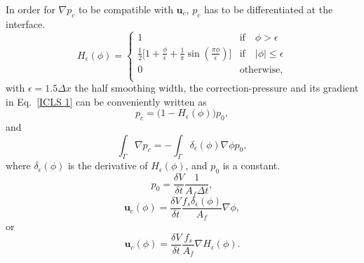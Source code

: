 In order for $\nabla p_c$ to be compatible with ${\bm u}_c$, $p_c$ has to be differentiated at the interface. 
\begin{equation}
    H_\epsilon(\phi)=
    \begin{cases}
        1 \quad \quad & \textrm{if} \quad \phi > \epsilon \\
        \tfrac{1}{2}\big[1+\tfrac{\phi}{\epsilon}+\tfrac{1}{\pi} \sin(\tfrac{\pi \phi}{\epsilon})\big] & 
        \textrm{if} \quad |\phi| \leqslant \epsilon  \\
        0 \quad & \textrm{otherwise}, \\
    \end{cases}
    \label{regularized heav}
\end{equation}
with $\epsilon=1.5\Delta x$ the half smoothing width, the correction-pressure and its gradient in Eq.\ \eqref{ICLS 1} can be conveniently written as
\begin{equation}
    p_c = \big(1-H_\epsilon(\phi)\big)p_0,
  \label{ipressure}
\end{equation}
and
\begin{equation}
    \int_\Gamma \nabla p_c = - \int_\Gamma \delta_\epsilon (\phi) \nabla \phi p_0,
  \label{ipressure grad}
\end{equation}
where $\delta_\epsilon (\phi)$ is the derivative of $H_\epsilon(\phi)$, and $p_0$ is a constant. 
\begin{equation}
    p_0 = \frac{\delta V}{\delta t} \frac{1}{A_f \Delta t},
  \label{ipressure solution}
\end{equation}
\begin{equation}
    {\bm u}_c(\phi) = \frac{\delta V}{\delta t} \frac{f_s \delta_\epsilon(\phi)}{A_f} \nabla \phi,
  \label{correction vel sol}
\end{equation}
or
\begin{equation}
    {\bm u}_c(\phi) = \frac{\delta V}{\delta t} \frac{f_s}{A_f} \nabla H_\epsilon(\phi).
  \label{correction vel sol 2}
\end{equation}

